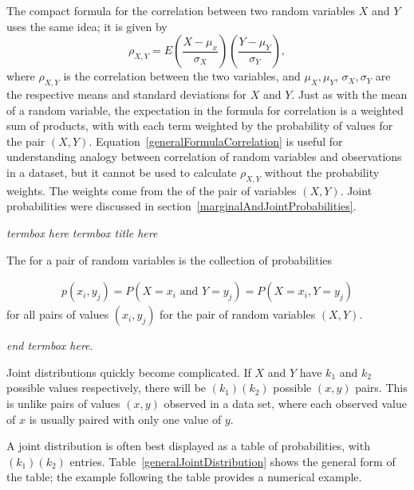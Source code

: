 The compact formula for the correlation between two random variables $X$ and $Y$  uses the same idea; it is given by
\begin{equation*}
	\rho_{X,Y} = E\left(\frac{X - \mu_x}{\sigma_X}\right)\left(\frac{Y - \mu_Y}{\sigma_Y} \right),
	\label{eq:generalFormulaCorrelation}
\end{equation*}
where $\rho_{X,Y}$ is the correlation between the two variables, and $\mu_X, \mu_Y$, $\sigma_X, \sigma_Y$ are the respective means and standard deviations for $X$ and $Y$. Just as with the mean of a random variable, the expectation in the formula for correlation is a weighted sum of products, with with each term weighted by the probability of values for the pair $(X,Y)$.  Equation~\ref{generalFormulaCorrelation} is useful for understanding analogy between correlation of random variables and observations in a dataset, but it cannot be used to calculate $\rho_{X,Y}$ without the probability weights.  The weights come from the  of the pair of variables $(X,Y)$.  Joint probabilities were discussed in section~\ref{marginalAndJointProbabilities}.

\textit{termbox here}  \textit{termbox title here}

The  for a pair of random variables is the collection of probabilities

\begin{align*}
	  p(x_i,y_j) = P(X=x_i \text{ and } Y = y_j) = P(X=x_i, Y=y_j)
\end{align*}
for all pairs of values $(x_i,y_j)$ for the pair of random variables $(X,Y)$.

\textit{end termbox  here}.

Joint distributions quickly become complicated.  If $X$ and $Y$ have $k_1$ and $k_2$ possible values respectively, there will be $(k_1)(k_2)$ possible $(x,y)$ pairs. This is unlike pairs of values $(x,y)$ observed in a data set, where each observed value of $x$ is usually paired with only one value of $y$. 

A joint distribution is often best displayed as a table of probabilities, with $(k_1)(k_2)$ entries.  Table~\ref{generalJointDistribution} shows the general form of the table; the example following the table provides a numerical example. 

